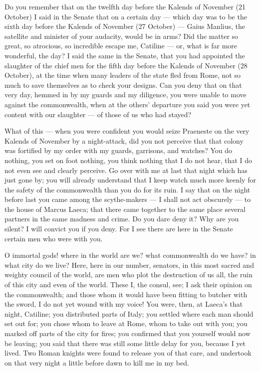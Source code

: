  Do you remember that on the twelfth day before the Kalends of November (21 October) I said in the Senate that on a certain day --- which day was to be the sixth day before the Kalends of November (27 October) --- Gaius Manlius, the satellite and minister of your audacity, would be in arms? Did the matter so great, so atrocious, so incredible escape me, Catiline --- or, what is far more wonderful, the day? I said the same in the Senate, that you had appointed the slaughter of the chief men for the fifth day before the Kalends of November (28 October), at the time when many leaders of the state fled from Rome, not so much to save themselves as to check your designs. Can you deny that on that very day, hemmed in by my guards and my diligence, you were unable to move against the commonwealth, when at the others' departure you said you were yet content with our slaughter --- of those of us who had stayed?

 What of this --- when you were confident you would seize Praeneste on the very Kalends of November by a night-attack, did you not perceive that that colony was fortified by my order with my guards, garrisons, and watches? You do nothing, you set on foot nothing, you think nothing that I do not hear, that I do not even see and clearly perceive. Go over with me at last that night which has just gone by; you will already understand that I keep watch much more keenly for the safety of the commonwealth than you do for its ruin. I say that on the night before last you came among the scythe-makers --- I shall not act obscurely --- to the house of Marcus Laeca; that there came together to the same place several partners in the same madness and crime. Do you dare deny it? Why are you silent? I will convict you if you deny. For I see there are here in the Senate certain men who were with you.

 O immortal gods! where in the world are we? what commonwealth do we have? in what city do we live? Here, here in our number, senators, in this most sacred and weighty council of the world, are men who plot the destruction of us all, the ruin of this city and even of the world. These I, the consul, see; I ask their opinion on the commonwealth; and those whom it would have been fitting to butcher with the sword, I do not yet wound with my voice! You were, then, at Laeca's that night, Catiline; you distributed parts of Italy; you settled where each man should set out for; you chose whom to leave at Rome, whom to take out with you; you marked off parts of the city for fires; you confirmed that you yourself would now be leaving; you said that there was still some little delay for you, because I yet lived. Two Roman knights were found to release you of that care, and undertook on that very night a little before dawn to kill me in my bed.


